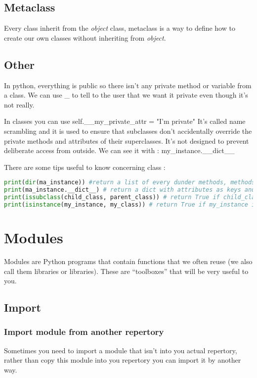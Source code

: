 \documentclass[a4paper, 12pt]{article}
\begin{document}
\subsection{Metaclass}
Every class inherit from the \textit{object} class, metaclass is a way to define how to create our own classes without inheriting from \textit{object}.

\subsection{Other}
In python, everything is public so there isn't any private method or variable from a class. We can use \_ to tell to the user that we want it private even though it's not really.

In classes you can use self.\_\_my\_private\_attr = "I'm private" 
It's called name scrambling and it is used to ensure that subclasses don't accidentally override the private methods and attributes of their superclasses. It's not designed to prevent deliberate access from outside. We can see it with : my\_instance.\_\_dict\_\_

There are some tips useful to know concerning class :
\begin{lstlisting}[language=Python]
print(dir(ma_instance)) #return a list of every dunder methods, methods and attributes from the class.
print(ma_instance.__dict__) # return a dict with attributes as keys and their value. associated.
print(issubclass(child_class, parent_class)) # return True if child_class is the child of parent_class.
print(isinstance(my_instance, my_class)) # return True if my_instance is an instance from my_class.
\end{lstlisting}

\newpage
\section{Modules}
Modules are Python programs that contain functions that we often reuse (we also call them libraries or libraries). These are “toolboxes” that will be very useful to you.\newline

\subsection{Import}
\label{subsec:Import}
\subsubsection{Import module from another repertory}
Sometimes you need to import a module that isn't into you actual repertory, rather than copy this module into you repertory you can import it by another way. \\
\end{document}

